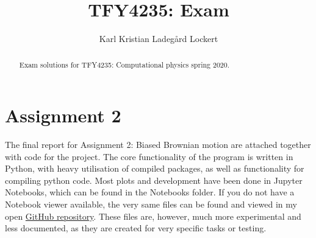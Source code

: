 \documentclass[11pt,a4paper,twocolumn]{article}
\author{Karl Kristian Ladegård Lockert}
\title{TFY4235: Exam}
\begin{document}
\maketitle
\begin{abstract}

Exam solutions for TFY4235: Computational physics spring 2020.

\end{abstract}
		
\section{Assignment 2}
The final report for Assignment 2: Biased Brownian motion are attached together with code for the project. The core functionality of the program is written in Python, with heavy utilisation of compiled packages, as well as functionality for compiling python code. Most plots and development have been done in Jupyter Notebooks, which can be found in the Notebooks folder. If you do not have a Notebook viewer available, the very same files can be found and viewed in my open \href{https://github.com/kklocker/NumFys}{GitHub repository}. These files are, however, much more experimental and less documented, as they are created for very specific tasks or testing. 
\end{document}

